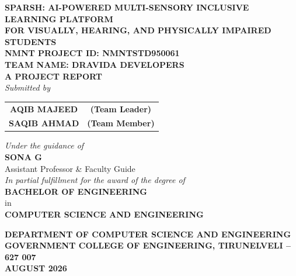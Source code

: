 \documentclass[12pt,a4paper]{report}
\begin{document}
\begin{titlepage}
    \centering
    \vspace*{0.2cm}
    
    {\Large \bfseries SPARSH: AI-POWERED MULTI-SENSORY INCLUSIVE LEARNING PLATFORM}\\[0.3cm]
    {\large \bfseries FOR VISUALLY, HEARING, AND PHYSICALLY IMPAIRED STUDENTS}\\[0.8cm]
    
    {\small \textbf{NMNT PROJECT ID: NMNTSTD950061}}\\[0.2cm]
    {\large \textbf{TEAM NAME: DRAVIDA DEVELOPERS}}\\[0.8cm]
    
    {\large \bfseries A PROJECT REPORT}\\[0.3cm]
    {\large \textit{Submitted by}}\\[0.6cm]
    
    \begin{table}[h!]
        \centering
        \large
        \begin{tabular}{c c}
            \textbf{AQIB MAJEED} & \textbf{(Team Leader)} \\[0.2cm]
            \textbf{SAQIB AHMAD} & \textbf{(Team Member)} \\
        \end{tabular}
    \end{table}
    
    \vspace{0.6cm}
    {\large \textit{Under the guidance of}}\\[0.2cm]
    {\large \bfseries SONA G}\\[0.1cm]
    {\normalsize Assistant Professor \& Faculty Guide}\\[0.8cm]
    
    {\normalsize \textit{In partial fulfillment for the award of the degree of}}\\[0.2cm]
    {\large \bfseries BACHELOR OF ENGINEERING}\\[0.1cm]
    {\normalsize in}\\[0.1cm]
    {\large \bfseries COMPUTER SCIENCE AND ENGINEERING}\\[0.8cm]
    
    \vfill
    
    {\large \bfseries DEPARTMENT OF COMPUTER SCIENCE AND ENGINEERING}\\[0.2cm]
    {\large \bfseries GOVERNMENT COLLEGE OF ENGINEERING, TIRUNELVELI -- 627 007}\\[0.2cm]
    {\large \textbf{AUGUST 2026}}
\end{titlepage}
\end{document}
